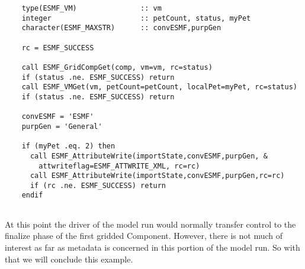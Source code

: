  \begin{verbatim}
    type(ESMF_VM)               :: vm
    integer                     :: petCount, status, myPet
    character(ESMF_MAXSTR)      :: convESMF,purpGen

    rc = ESMF_SUCCESS

    call ESMF_GridCompGet(comp, vm=vm, rc=status)
    if (status .ne. ESMF_SUCCESS) return
    call ESMF_VMGet(vm, petCount=petCount, localPet=myPet, rc=status)
    if (status .ne. ESMF_SUCCESS) return

    convESMF = 'ESMF'
    purpGen = 'General'

    if (myPet .eq. 2) then
      call ESMF_AttributeWrite(importState,convESMF,purpGen, &
        attwriteflag=ESMF_ATTWRITE_XML, rc=rc)
      call ESMF_AttributeWrite(importState,convESMF,purpGen,rc=rc)
      if (rc .ne. ESMF_SUCCESS) return
    endif
 
\end{verbatim}
 

   At this point the driver of the model run would normally transfer control
   to the finalize phase of the first gridded Component.  However, there is
   not much of interest as far as metadata is concerned in this portion
   of the model run.  So with that we will conclude this example.
\setlength{\parskip}{\oldparskip}
\setlength{\parindent}{\oldparindent}
\setlength{\baselineskip}{\oldbaselineskip}
